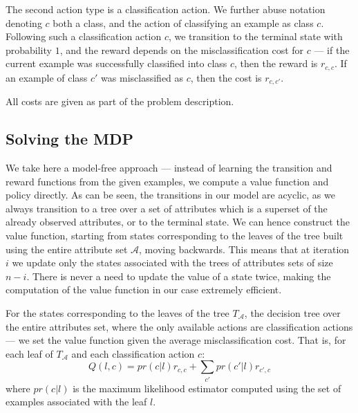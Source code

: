 \documentclass[letterpaper]{article}
\theoremstyle{definition}
\begin{document}
The second action type is a classification action. We further abuse notation  denoting  $c$ both a class, and the action of classifying an example as class $c$. Following such a classification action $c$, we transition to the terminal state with probability $1$, and the reward depends on the misclassification cost for $c$ --- if the current example was successfully classified into class $c$, then the reward is $r_{c,c}$. If an example of class $c'$ was misclassified as $c$, then the cost is $r_{c,c'}$.

All costs are given as part of the problem description.

\subsection{Solving the MDP}


We take here a model-free approach --- instead of learning the transition and reward functions from the given examples, we compute a value function and policy directly. As can be seen, the transitions in our model are acyclic, as we always transition to a tree over a set of attributes which is a superset of the already observed attributes, or to the terminal state. We can hence construct the value function, starting from states corresponding to the leaves of the tree built using the entire attribute set $\mathcal{A}$, moving backwards. This means that at iteration $i$ we update only the states associated with the trees of attributes sets of size $n-i$. There is never a need to update the value of a state twice, making the computation of the value function in our case extremely efficient.

For the states corresponding to the leaves of the tree $T_\mathcal{A}$, the decision tree over the entire attributes set, where the only available actions are classification actions --- we set the value function given the average misclassification cost. That is, for each leaf of $T_\mathcal{A}$ and each classification action $c$:
{\footnotesize
\begin{equation}
\label{eqn:qlc}
Q(l,c) = pr(c|l)r_{c,c} + \sum_{c'}pr(c'|l)r_{c',c}
\end{equation}
}where $pr(c|l)$ is the maximum likelihood estimator computed using the set of examples associated with the leaf $l$.
\end{document}
